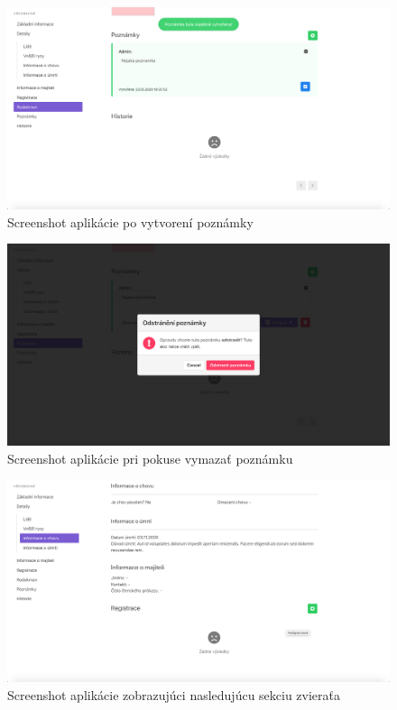 \begin{figure}[H]
	\includegraphics[width=1.0\textwidth]{media/priloha/zviera/poznamka/4.png}
	\caption{Screenshot aplikácie po vytvorení poznámky}
\end{figure}

\begin{figure}[H]
	\includegraphics[width=1.0\textwidth]{media/priloha/zviera/poznamka/5.png}
	\caption{Screenshot aplikácie pri pokuse vymazať poznámku}
\end{figure}

\begin{figure}[H]
	\includegraphics[width=1.0\textwidth]{media/priloha/zviera/registracia/1.png}
	\caption{Screenshot aplikácie zobrazujúci nasledujúcu sekciu zvieraťa}
\end{figure}

